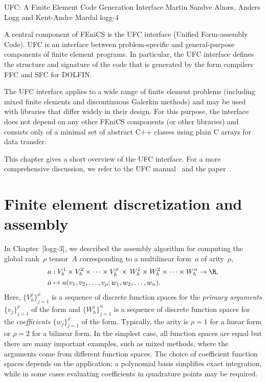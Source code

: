               {UFC: A Finite Element Code Generation Interface}
              {Martin Sandve Aln\ae{}s, Anders Logg and Kent-Andre Mardal}
              {logg-4}

A central component of FEniCS is the UFC interface (Unified
Form-assembly Code). UFC is an interface between problem-specific and
general-purpose components of finite element programs. In particular,
the UFC interface defines the structure and signature of the code that
is generated by the form compilers FFC and SFC for DOLFIN.

The UFC interface applies to a wide range of finite element problems
(including mixed finite elements and discontinuous Galerkin methods)
and may be used with libraries that differ widely in their design. For
this purpose, the interface does not depend on any other FEniCS
components (or other libraries) and consists only of a minimal set of
abstract C++ classes using plain C arrays for data transfer.

This chapter gives a short overview of the UFC interface. For a more
comprehensive discussion, we refer to the UFC
manual~\cite{AlnaesLangtangenEtAl2007} and the
paper~\cite{AlnaesLoggMardalEtAl2009aa}.

\section{Finite element discretization and assembly}
\label{sec:fem}

In Chapter~[logg-3], we described the assembly algorithm for computing
the global rank~$\rho$ tensor~$A$ corresponding to a multilinear
form~$a$ of arity~$\rho$,
\begin{equation} \label{eq:varform}
  \begin{split}
    a &: V_h^1 \times V_h^2 \times \cdots \times V_h^{\rho} \, \times \,
         W_h^1 \times W_h^2 \times \cdots \times W_h^n \rightarrow \R, \\
    a &\mapsto a(v_1, v_2, \ldots, v_{\rho}; w_1, w_2, \ldots, w_n).
  \end{split}
\end{equation}
Here, $\{V_h^j\}_{j=1}^{\rho}$ is a sequence of discrete function
spaces for the \emph{primary arguments} $\{v_j\}_{j=1}^{\rho}$ of the
form and $\{W_h^j\}_{j=1}^n$ is a sequence of discrete function spaces
for the \emph{coefficients} $\{w_j\}_{j=1}^{\rho}$ of the
form. Typically, the arity is $\rho=1$ for a linear form or $\rho=2$
for a bilinear form. In the simplest case, all function spaces are
equal but there are many important examples, such as mixed methods,
where the arguments come from different function spaces. The choice of
coefficient function spaces depends on the application; a polynomial
basis simplifies exact integration, while in some cases evaluating
coefficients in quadrature points may be required.

